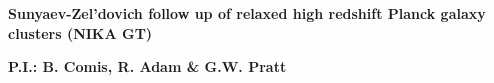 \documentclass[11pt,a4paper,twoside,graphicx,color]{article}
\begin{document}
%
%
\begin{center}{\huge \bf
Sunyaev-Zel'dovich follow up of relaxed high redshift Planck galaxy clusters (NIKA GT)
}\end{center}
% 
\centerline{\bf P.I.: B. Comis,  R. Adam \& G.W. Pratt}



\vspace{-0.3cm}
\end{document}
